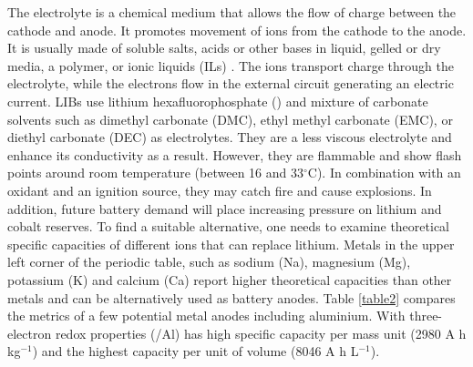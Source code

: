 \vspace{3mm}
The electrolyte is a chemical medium that allows the flow of charge between the cathode and anode. It promotes movement of ions from the cathode to the anode. It is usually made of soluble salts, acids or other bases in liquid, gelled or dry media, a polymer, or ionic liquids (ILs) \cite{xu_nonaqueous_2004,armand_ionic-liquid_2009,croce_nanocomposite_1998}. The ions transport charge through the electrolyte, while the electrons flow in the external circuit generating an electric current. LIBs use lithium hexafluorophosphate () and mixture of carbonate solvents such as dimethyl carbonate (DMC), ethyl methyl carbonate (EMC), or diethyl carbonate (DEC) as electrolytes. They are a less viscous electrolyte and enhance its conductivity as a result. However, they are flammable and show flash points around room temperature (between 16 and 33$^{\circ}$C). In combination with an oxidant and an ignition source, they may catch fire and cause explosions. In addition, future battery demand will place increasing pressure on lithium and cobalt reserves\cite{turcheniuk_ten_2018}. To find a suitable alternative, one needs to examine theoretical specific capacities of different ions that can replace lithium. Metals in the upper left corner of the periodic table, such as sodium (Na), magnesium (Mg), potassium (K) and calcium (Ca) report higher theoretical capacities than other metals and can be alternatively used as battery anodes. Table  \ref{table2} compares the metrics of a few potential metal anodes including aluminium. With three-electron redox properties (/Al) has high specific capacity per mass unit (2980 A h kg$^{-1}$) and the highest capacity per unit of volume (8046 A h L$^{-1}$)\cite{ambroz_trends_2017}.

